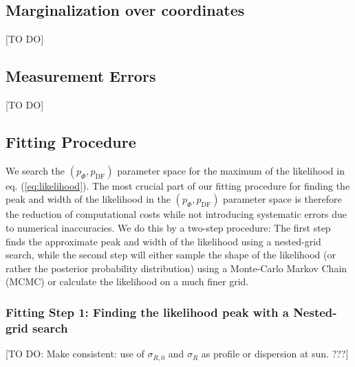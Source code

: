 \documentclass[12pt,preprint]{aastex}
\begin{document}
\subsection{Marginalization over coordinates}
[TO DO]

\subsection{Measurement Errors}

[TO DO]

\subsection{Fitting Procedure}

We search the $(p_\Phi,p_\text{DF})$ parameter space for the maximum of the likelihood in eq. (\ref{eq:likelihood}). The most crucial part of our fitting procedure for finding the peak and width of the likelihood in the $(p_\Phi,p_\text{DF})$ parameter space  is therefore the reduction of computational costs while not introducing systematic errors due to numerical inaccuracies. We do this by a two-step procedure: The first step finds the approximate peak and width of the likelihood using a nested-grid search, while the second step will either sample the shape of the likelihood (or rather the posterior probability distribution) using a Monte-Carlo Markov Chain (MCMC) or calculate the likelihood on a much finer grid.

\subsubsection{Fitting Step 1: Finding the likelihood peak with a Nested-grid search}

[TO DO: Make consistent: use of $\sigma_{R,0}$ and $\sigma_R$ as profile or dispersion at sun. ???]
\end{document}
